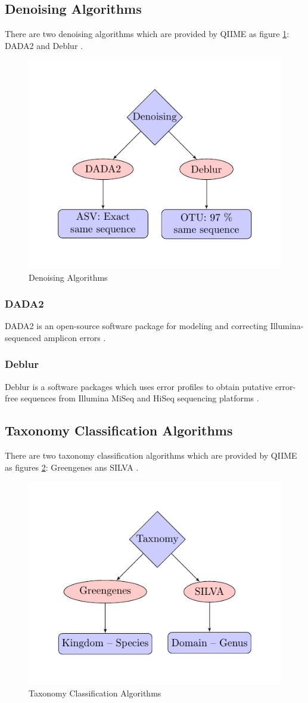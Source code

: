 \documentclass[a4paper]{article}
\begin{document}
        \subsection{Denoising Algorithms}
            There are two denoising algorithms which are provided by QIIME as figure \ref{fig:denoising}: DADA2 \cite{DADA2} and Deblur \cite{Deblur1}.

            \begin{figure}[p]
                \centering
                \includegraphics[width=0.3 \linewidth]{figures/tikz/denoising.pdf}
                \caption{Denoising Algorithms}
                \label{fig:denoising}
            \end{figure}

            \subsubsection{DADA2}
                DADA2 is an open-source software package for modeling and correcting Illumina-sequenced amplicon errors \cite{DADA2}.

            \subsubsection{Deblur}
                Deblur is a software packages which uses error profiles to obtain putative error-free sequences from Illumina MiSeq and HiSeq sequencing platforms \cite{Deblur1}.

        \subsection{Taxonomy Classification Algorithms}
            There are two taxonomy classification algorithms which are provided by QIIME as figures \ref{fig:taxonomy}: Greengenes \cite{greengenes1} ans SILVA \cite{silva1, silva2}.

            \begin{figure}[p]
                \centering
                \includegraphics[width=0.3 \linewidth]{figures/tikz/taxonomy.pdf}
                \caption{Taxonomy Classification Algorithms}
                \label{fig:taxonomy}
            \end{figure}
\end{document}
